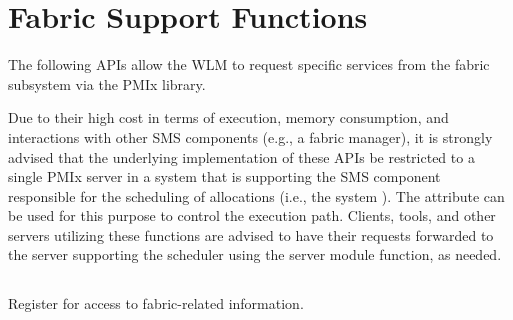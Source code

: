 \section{Fabric Support Functions}

The following \acp{API} allow the \ac{WLM} to request specific services from the fabric subsystem via the \ac{PMIx} library.

\advicermstart
Due to their high cost in terms of execution, memory consumption, and interactions with other \ac{SMS} components (e.g., a fabric manager), it is strongly advised that the underlying implementation of these \acp{API} be restricted to a single \ac{PMIx} server in a system that is supporting the \ac{SMS} component responsible for the scheduling of allocations (i.e., the system ). The  attribute can be used for this purpose to control the execution path. Clients, tools, and other servers utilizing these functions are advised to have their requests forwarded to the server supporting the scheduler using the  server module function, as needed.
\advicermend

\subsection{}

\summary

Register for access to fabric-related information.

\format


\begin{arglist}
\end{arglist}

